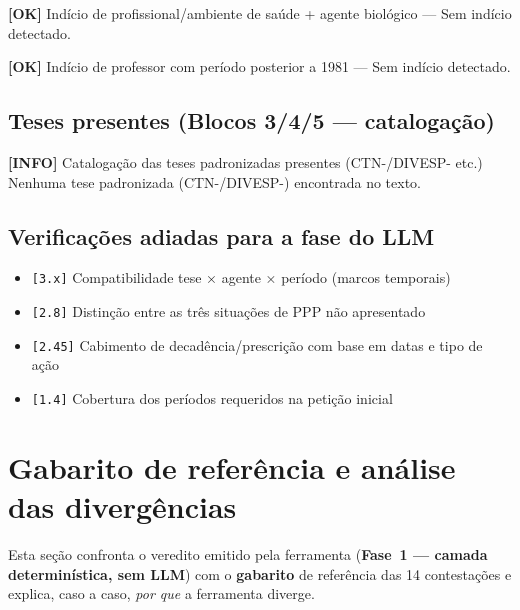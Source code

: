 \documentclass[12pt,a4paper]{article}
\newcommand{\statusOK}[1]{\textcolor{corOK}{\textbf{[OK]}} #1}
\newcommand{\statusINFO}[1]{\textcolor{corINFO}{\textbf{[INFO]}} #1}
\begin{document}
\medskip
\statusOK{Indício de profissional/ambiente de saúde + agente biológico} --- Sem indício detectado.

\medskip
\statusOK{Indício de professor com período posterior a 1981} --- Sem indício detectado.

\subsection{Teses presentes (Blocos 3/4/5 --- catalogação)}

\statusINFO{Catalogação das teses padronizadas presentes (CTN-/DIVESP- etc.)}\\
Nenhuma tese padronizada (CTN-/DIVESP-) encontrada no texto.

\subsection{Verificações adiadas para a fase do LLM}

\begin{itemize}
  \item \texttt{[3.x]} Compatibilidade tese × agente × período (marcos temporais)
  \item \texttt{[2.8]} Distinção entre as três situações de PPP não apresentado
  \item \texttt{[2.45]} Cabimento de decadência/prescrição com base em datas e tipo de ação
  \item \texttt{[1.4]} Cobertura dos períodos requeridos na petição inicial
\end{itemize}



\clearpage
{}
\section{Gabarito de referência e análise das divergências}

Esta seção confronta o veredito emitido pela ferramenta (\textbf{Fase~1 ---
camada determinística, sem LLM}) com o \textbf{gabarito} de referência das 14
contestações e explica, caso a caso, \emph{por que} a ferramenta diverge.
\end{document}
